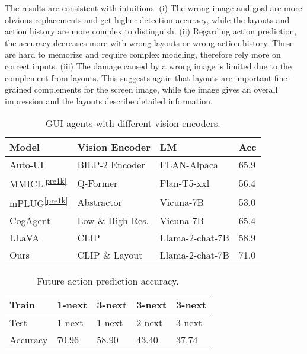 The results are consistent with intuitions. 
(i) The wrong image and goal are more obvious replacements and get higher detection accuracy, while the layouts and action history are more complex to distinguish. 
(ii) Regarding action prediction, the accuracy decreases more with wrong layouts or wrong action history.
Those are hard to memorize and require complex modeling, therefore rely more on correct inputs.
(iii) The damage caused by a wrong image is limited due to the complement from layouts.
This suggests again that layouts are important fine-grained complements for the screen image, while the image gives an overall impression and the layouts describe detailed information. 
\begin{table}[thb]
	\centering\small
        \setlength{\abovecaptionskip}{0.2cm}
        \setlength{\belowcaptionskip}{-0.3cm}
	{\begin{tabular}{p{1.1cm}p{2.2cm}p{2.2cm}p{0.4cm}}
		\toprule
		  Model & Vision Encoder & LM & Acc   \\
            \midrule
            Auto-UI & BILP-2 Encoder &FLAN-Alpaca & 65.9  \\
            MMICL\textsuperscript{\ref{pre1k}} & Q-Former & Flan-T5-xxl & 56.4 \\
            mPLUG\textsuperscript{\ref{pre1k}} & Abstractor & Vicuna-7B & 53.0\\
            CogAgent & Low \& High Res. & Vicuna-7B & 65.4 \\
            LLaVA & CLIP  & Llama-2-chat-7B & 58.9\\
            Ours & CLIP \& Layout & Llama-2-chat-7B & 71.0\\
		\bottomrule
	\end{tabular}
	}
        \caption{GUI agents with different vision encoders.}
	\label{vision}
\end{table}

\begin{table}[thb]
	\centering\small
        \setlength{\abovecaptionskip}{0.2cm}
        \setlength{\belowcaptionskip}{-0.3cm}
	{\begin{tabular}{p{1.2cm}p{1.0cm}p{1.0cm}p{1.0cm}p{1.0cm}}
		\toprule
		  Train & 1-next & 3-next & 3-next & 3-next   \\
            \midrule
            Test & 1-next & 1-next & 2-next & 3-next \\
            \midrule
            Accuracy  & 70.96 & 58.90 & 43.40 & 37.74 \\
		\bottomrule
	\end{tabular}
	}
        \caption{Future action prediction accuracy.}
	\label{future}
\end{table}

